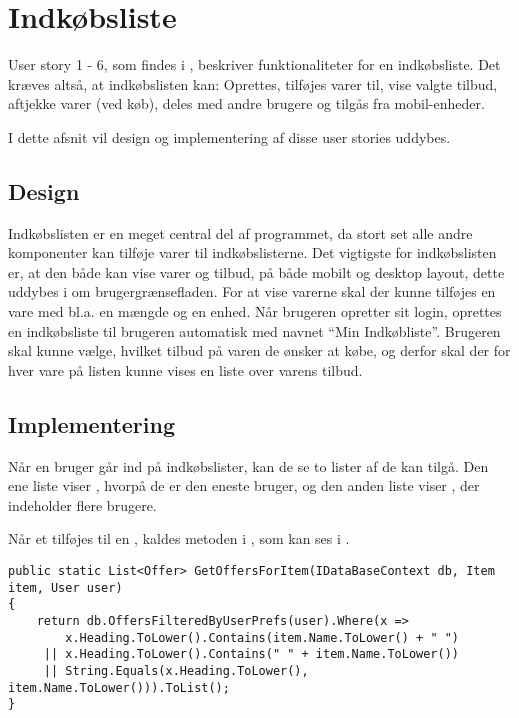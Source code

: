 \section{Indkøbsliste}
User story 1 - 6, som findes i , beskriver funktionaliteter for en indkøbsliste.
Det kræves altså, at indkøbslisten kan: Oprettes, tilføjes varer til, vise valgte tilbud, aftjekke varer (ved køb), deles med andre brugere og tilgås fra mobil-enheder.

I dette afsnit vil design og implementering af disse user stories uddybes.

\subsection{Design}
Indkøbslisten er en meget central del af programmet, da stort set alle andre komponenter kan tilføje varer til indkøbslisterne.
Det vigtigste for indkøbslisten er, at den både kan vise varer og tilbud, på både mobilt og desktop layout, dette uddybes i  om brugergrænsefladen.
For at vise varerne skal der kunne tilføjes en vare med bl.a. en mængde og en enhed.
Når brugeren opretter sit login, oprettes en indkøbsliste til brugeren automatisk med navnet ``Min Indkøbliste''.
Brugeren skal kunne vælge, hvilket tilbud på varen de ønsker at købe, og derfor skal der for hver vare på listen kunne vises en liste over varens tilbud.

\subsection{Implementering}
Når en bruger går ind på indkøbslister, kan de se to lister af  de kan tilgå.
Den ene liste viser , hvorpå de er den eneste bruger, og den anden liste viser , der indeholder flere brugere.

Når et  tilføjes til en , kaldes metoden  i , som kan ses i .

\begin{lstlisting}[caption={Metoden \class{GetOffersForItem} finder relevante tilbud og returner dem som en liste}, label=getoffersforitem]
public static List<Offer> GetOffersForItem(IDataBaseContext db, Item item, User user)
{
    return db.OffersFilteredByUserPrefs(user).Where(x => 
     	x.Heading.ToLower().Contains(item.Name.ToLower() + " ") 
     || x.Heading.ToLower().Contains(" " + item.Name.ToLower()) 
     || String.Equals(x.Heading.ToLower(), item.Name.ToLower())).ToList();
}
\end{lstlisting}

